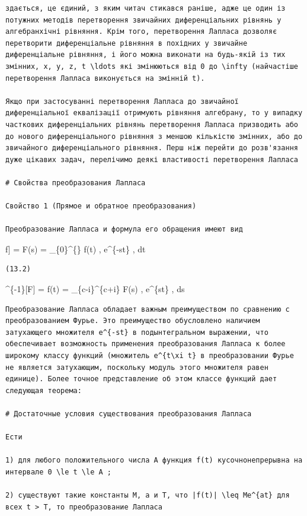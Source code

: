 \documentclass[
  ukrainian,
]{article}
\begin{document}
\begin{verbatim}
здається, це єдиний, з яким читач стикався раніше, адже це один із потужних методів перетворення звичайних диференціальних рівнянь у алгебранхічні рівняння. Крім того, перетворення Лапласа дозволяє перетворити диференціальне рівняння в похідних у звичайне диференціальне рівняння, і його можна виконати на будь-якій із тих змінних, x, y, z, t \ldots які змінюються від 0 до \infty (найчастіше перетворення Лапласа виконується на змінній t).

Якщо при застосуванні перетворення Лапласа до звичайної диференціальної еквалізації отримують рівняння алгебрану, то у випадку часткових диференціальних рівнянь перетворення Лапласа призводить або до нового диференціального рівняння з меншою кількістю змінних, або до звичайного диференціального рівняння. Перш ніж перейти до розв'язання дуже цікавих задач, перелічимо деякі властивості перетворення Лапласа

# Свойства преобразования Лапласа

Свойство 1 (Прямое и обратное преобразования)

Преобразование Лапласа и формула его обращения имеют вид
\end{verbatim}

\mathscr{L}{[}f{]} = F(s) = \int\_\{0\}\^{}\{\infty\} f(t) ,
e\^{}\{-st\} , dt \quad {}

\begin{verbatim}
(13.2)
\end{verbatim}

\^{}\{-1\}{[}F{]} = f(t) = 
\int\_\{c-i\infty\}\^{}\{c+i\infty\} F(s) , e\^{}\{st\} , ds
\quad {}

\begin{verbatim}
Преобразование Лапласа обладает важным преимуществом по сравнению с преобразованием Фурье. Это преимущество обусловлено наличием затухающего множителя e^{-st} в подынтегральном выражении, что обеспечивает возможность применения преобразования Лапласа к более широкому классу функций (множитель e^{t\xi t} в преобразовании Фурье не является затухающим, поскольку модуль этого множителя равен единице). Более точное представление об этом классе функций дает следующая теорема:

# Достаточные условия существования преобразования Лапласа

Ести

1) для любого положительного числа A функция f(t) кусочнонепрерывна на интервале 0 \le t \le A ;

2) существуют такие константы M, a и T, что |f(t)| \leq Me^{at} для всех t > T, то преобразование Лапласа
\end{verbatim}
\end{document}
